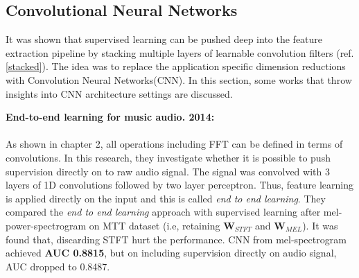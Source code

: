 \subsection{Convolutional Neural Networks}
\label{convolution}
It was shown that supervised learning can be pushed deep into the feature extraction pipeline by stacking multiple layers of learnable convolution filters (ref. \ref{stacked}). The idea was to replace the application specific dimension reductions with Convolution Neural Networks(CNN). In this section, some works that throw insights into CNN architecture settings are discussed. 
\bigskip

\noindent \textbf{End-to-end learning for music audio. 2014\cite{EndToEnd}:}\\
\\
\noindent As shown in chapter 2, all operations including FFT can be defined in terms of convolutions. In this research, they investigate whether it is possible to push supervision directly on to raw audio signal. The signal was convolved with 3 layers of 1D convolutions followed by two layer perceptron. Thus, feature learning is applied directly on the input and this is called\textit{ end to end learning}. They compared the \textit{end to end learning} approach with supervised learning after mel-power-spectrogram on MTT dataset (i.e, retaining $\textbf{W}_{STFT}$ and $\textbf{W}_{MEL}$). It was found that, discarding STFT hurt the performance. CNN from mel-spectrogram achieved \textbf{AUC 0.8815}, but on including supervision directly on audio signal, AUC dropped to 0.8487.     
 
